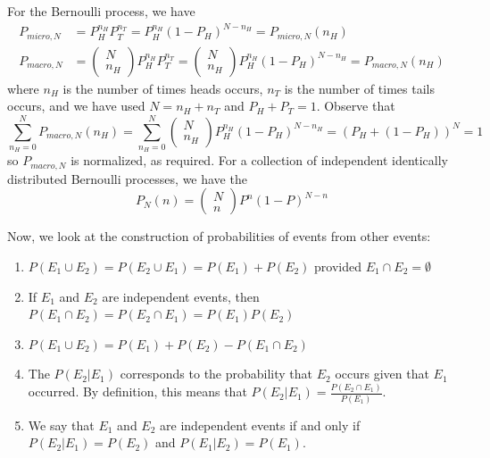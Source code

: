 \documentclass[12pt, a4paper, oneside, openright, titlepage]{book}
\begin{document}
For the Bernoulli process, we have \begin{align*}
    P_{micro,N} &= P_H^{n_H}P_T^{n_T} = P_H^{n_H}(1-P_H)^{N-n_H} = P_{micro,N}(n_H) \\
    P_{macro, N} &= \begin{pmatrix} N \\ n_H \end{pmatrix}P_H^{n_H}P_T^{n_T} = \begin{pmatrix} N \\ n_H \end{pmatrix}P_H^{n_H}(1-P_H)^{N-n_H} = P_{macro,N}(n_H)
\end{align*}
where $n_H$ is the number of times heads occurs, $n_T$ is the number of times tails occurs, and we have used $N = n_H + n_T$ and $P_H + P_T = 1$. Observe that \begin{equation*}
    \sum_{n_H=0}^NP_{macro,N}(n_H) = \sum_{n_H=0}^N\begin{pmatrix} N \\ n_H \end{pmatrix}P_H^{n_H}(1-P_H)^{N-n_H} = (P_H + (1-P_H))^N = 1
\end{equation*}
so $P_{macro,N}$ is normalized, as required. For a collection of independent identically distributed Bernoulli processes, we have the  \begin{equation*}
    P_N(n) = \begin{pmatrix} N \\ n\end{pmatrix} P^n(1-P)^{N-n}
\end{equation*}

Now, we look at the construction of probabilities of events from other events: \begin{enumerate}[label=\roman*]
    \item $P(E_1\cup E_2) = P(E_2 \cup E_1) = P(E_1)+P(E_2)$ provided $E_1\cap E_2 = \emptyset$
    \item If $E_1$ and $E_2$ are independent events, then $P(E_1\cap E_2) = P(E_2\cap E_1) = P(E_1)P(E_2)$
    \item $P(E_1\cup E_2) = P(E_1) + P(E_2) - P(E_1\cap E_2)$
    \item The  $P(E_2\vert E_1)$ corresponds to the probability that $E_2$ occurs given that $E_1$ occurred. By definition, this means that $P(E_2\vert E_1) = \frac{P(E_2\cap E_1)}{P(E_1)}$.
    \item We say that $E_1$ and $E_2$ are independent events if and only if $P(E_2\vert E_1) = P(E_2)$ and $P(E_1\vert E_2) = P(E_1)$.
\end{enumerate}
\end{document}

